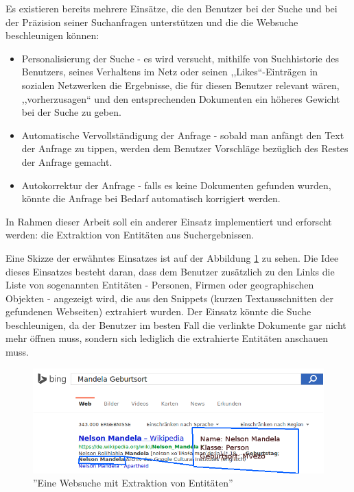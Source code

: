 Es existieren bereits mehrere Einsätze, die den Benutzer bei der Suche und bei der Präzision seiner Suchanfragen unterstützen und die die Websuche beschleunigen können:
\begin{itemize}
\item Personalisierung der Suche\cite{noll2007web} - es wird versucht, mithilfe von Suchhistorie des Benutzers, seines Verhaltens im Netz oder seinen ,,Likes``-Einträgen in sozialen Netzwerken die Ergebnisse, die für diesen Benutzer relevant wären, ,,vorherzusagen`` und den entsprechenden Dokumenten ein höheres Gewicht bei der Suche zu geben.
\item Automatische Vervollständigung der Anfrage - sobald man anfängt den Text der Anfrage zu tippen, werden dem Benutzer Vorschläge bezüglich des Restes der Anfrage gemacht.
\item Autokorrektur der Anfrage - falls es keine Dokumenten gefunden wurden, könnte die Anfrage bei Bedarf automatisch korrigiert werden.
\end{itemize}

In Rahmen dieser Arbeit soll ein anderer Einsatz implementiert und erforscht werden: die Extraktion von Entitäten aus Suchergebnissen. 

Eine Skizze der erwähntes Einsatzes ist auf der Abbildung \ref{fig:bing-and-entity} zu sehen. Die Idee dieses Einsatzes besteht daran, dass dem Benutzer zusätzlich zu den Links die Liste von sogenannten Entitäten - Personen, Firmen oder geographischen Objekten - angezeigt wird, die aus den Snippets (kurzen Textausschnitten der gefundenen Webseiten) extrahiert wurden. Der Einsatz könnte die Suche beschleunigen, da der Benutzer im besten Fall die verlinkte Dokumente gar nicht mehr öffnen muss, sondern sich lediglich die extrahierte Entitäten anschauen muss.

\begin{figure}
\centering
\includegraphics[width=1\textwidth]{Bilder/bing-and-entity1.png}
\caption{''Eine Websuche mit Extraktion von Entitäten''}
\label{fig:bing-and-entity}
\end{figure}

